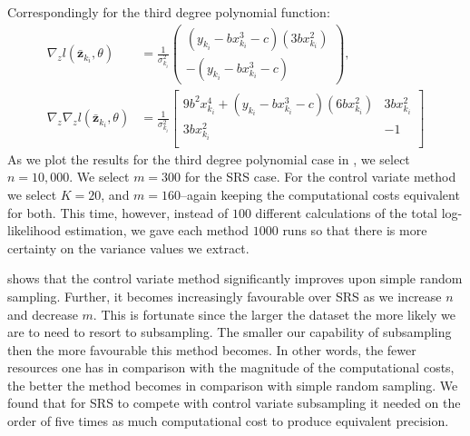 %
Correspondingly for the third degree polynomial function:
%
\begin{align}
   \nabla_z l(\bar{\textbf{z}}_{k_{i}},\theta) &= \frac{1}{\sigma_{k_{i}}^2} \begin{pmatrix}(y_{k_{i}}-bx_{k_{i}}^3-c)(3bx_{k_{i}}^2)\\-(y_{k_{i}}-bx_{k_{i}}^3-c)\end{pmatrix},\\
   \nabla_z \nabla_z l(\bar{\textbf{z}}_{k_{i}},\theta) &=  \frac{1}{\sigma_{k_{i}}^2} \begin{bmatrix}
9b^2x_{k_{i}}^4+(y_{k_{i}}-bx_{k_{i}}^3-c)(6bx_{k_{i}}^2) & 3bx_{k_{i}}^2 \\
3bx_{k_{i}}^2  & -1 \\
\end{bmatrix}
\end{align}
%
As we plot the results for the third degree polynomial case in , we select $n=10,000$. We select $m=300$ for the SRS case. For the control variate method we select $K=20$, and $m=160$--again keeping the computational costs equivalent for both. This time, however, instead of $100$ different calculations of the total log-likelihood estimation, we gave each method $1000$ runs so that there is more certainty on the variance values we extract.



 shows that the control variate method significantly improves upon simple random sampling. Further, it becomes increasingly favourable over SRS as we increase $n$ and decrease $m$. This is fortunate since the larger the dataset the more likely we are to need to resort to subsampling. The smaller our capability of subsampling then the more favourable this method becomes. In other words, the fewer resources one has in comparison with the magnitude of the computational costs, the better the method becomes in comparison with simple random sampling. We found that for SRS to compete with control variate subsampling it needed on the order of five times as much computational cost to produce equivalent precision. 





